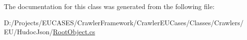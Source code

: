 The documentation for this class was generated from the following file\-:\begin{DoxyCompactItemize}
\item 
D\-:/\-Projects/\-E\-U\-C\-A\-S\-E\-S/\-Crawler\-Framework/\-Crawler\-E\-U\-Cases/\-Classes/\-Crawlers/\-E\-U/\-Hudoc\-Json/\hyperlink{_root_object_8cs}{Root\-Object.\-cs}\end{DoxyCompactItemize}
